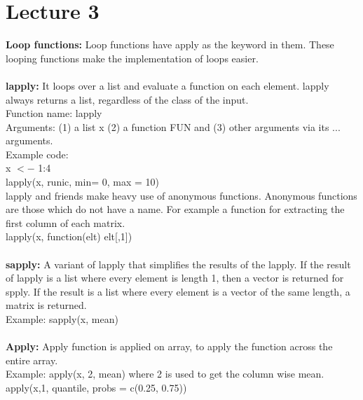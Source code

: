 \documentclass[a4paper,oneside, 12pt]{report}
\begin{document}
\section{Lecture 3}
{\bf Loop functions:} Loop functions have apply as the keyword in them. These looping functions make the implementation of loops easier. \\
\\
{\bf lapply:} It loops over a list and evaluate a function on each element. lapply always returns a list, regardless of the class of the input.\\
Function name: lapply\\
Arguments: (1) a list x (2) a function FUN and (3) other arguments via its ... arguments.\\
Example code: \\
x $<-$ 1:4 \\
lapply(x, runic, min= 0, max = 10)\\
lapply and friends make heavy use of anonymous functions. Anonymous functions are those which do not have a name. For example a function for extracting the first column of each matrix.\\
\indent \indent lapply(x, function(elt) elt[,1])
\\
\\
{\bf sapply:} A variant of lapply that simplifies the results of the lapply. If the result of lapply is a list where every element is length 1, then a vector is returned for spply. If the result is a list where every element is a vector of the same length, a matrix is returned. \\
Example: sapply(x, mean)
\\
\\
{\bf Apply:} Apply function is applied on array, to apply the function across the entire array.\\
Example: apply(x, 2, mean) where 2 is used to get the column wise mean.\\
\indent apply(x,1, quantile, probs = c(0.25, 0.75))\\
\end{document}

